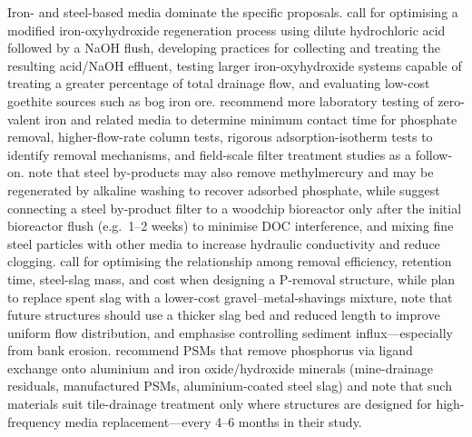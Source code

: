 Iron- and steel-based media dominate the specific proposals. \textcite{Allred2017} call for optimising a modified iron-oxyhydroxide regeneration process using dilute hydrochloric acid followed by a NaOH flush, developing practices for collecting and treating the resulting acid/NaOH effluent, testing larger iron-oxyhydroxide systems capable of treating a greater percentage of total drainage flow, and evaluating low-cost goethite sources such as bog iron ore. \textcite{Allred2014} recommend more laboratory testing of zero-valent iron and related media to determine minimum contact time for phosphate removal, higher-flow-rate column tests, rigorous adsorption-isotherm tests to identify removal mechanisms, and field-scale filter treatment studies as a follow-on. \textcite{Hua2016} note that steel by-products may also remove methylmercury and may be regenerated by alkaline washing to recover adsorbed phosphate, while \textcite{Sellner2019b} suggest connecting a steel by-product filter to a woodchip bioreactor only after the initial bioreactor flush (e.g.\ 1--2 weeks) to minimise DOC interference, and mixing fine steel particles with other media to increase hydraulic conductivity and reduce clogging. \textcite{Wang2020d} call for optimising the relationship among removal efficiency, retention time, steel-slag mass, and cost when designing a P-removal structure, while \textcite{Shedekar2020} plan to replace spent slag with a lower-cost gravel--metal-shavings mixture, note that future structures should use a thicker slag bed and reduced length to improve uniform flow distribution, and emphasise controlling sediment influx---especially from bank erosion. \textcite{Penn2020} recommend PSMs that remove phosphorus via ligand exchange onto aluminium and iron oxide/hydroxide minerals (mine-drainage residuals, manufactured PSMs, aluminium-coated steel slag) and note that such materials suit tile-drainage treatment only where structures are designed for high-frequency media replacement---every 4--6 months in their study.

